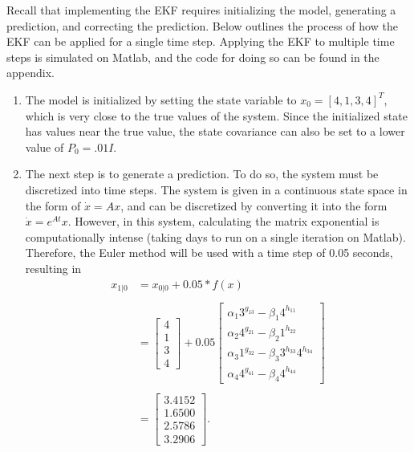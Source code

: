 Recall that implementing the EKF requires initializing the model, generating a prediction, and correcting the prediction. Below outlines the process of how the EKF can be applied for a single time step. Applying the EKF to multiple time steps is simulated on Matlab, and the code for doing so can be found in the appendix.

\begin{enumerate}
\item The model is initialized by setting the state variable to $x_0 = [4, 1, 3, 4]^T$, which is very close to the true values of the system. Since the initialized state has values near the true value, the state covariance can also be set to a lower value of $P_0 = .01I$. 
\item The next step is to generate a prediction. To do so, the system must be discretized into time steps. The system is given in a continuous state space in the form of $\dot x = Ax$, and can be discretized by converting it into the form $\dot x = e^{At}x$. However, in this system, calculating the matrix exponential is computationally intense (taking days to run on a single iteration on Matlab). Therefore, the Euler method will be used with a time step of 0.05 seconds, resulting in
\begin{align*}
 x_{1|0} &=  x_{0|0} + 0.05  * f(x) \\ \\
&= \begin{bmatrix}
4 \\
1\\
3 \\
4
\end{bmatrix} + 0.05
\begin{bmatrix}
 \alpha_1 3^{g_{13}} - \beta_1 4 ^{h_{11}} \\
 \alpha_2 4^{g_{21}} - \beta_2 1^{h_{22}} \\
 \alpha_3 1^{g_{32}} - \beta_3 3^{h_{33}} 4^{h_{34}} \\
\alpha_4  4^{g_{41}} - \beta_4 4^{h_{44}}
\end{bmatrix} \\ \\
&=\begin{bmatrix}
3.4152 \\
1.6500 \\
2.5786 \\
3.2906
\end{bmatrix}.
\end{align*}


\end{enumerate}
